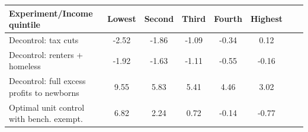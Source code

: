 \footnotesize
\renewcommand{\arraystretch}{1.2}
\begin{center}
\begin{tabular}{lccccccc}
\toprule
\textbf{Experiment/Income quintile} & \textbf{Lowest} & \textbf{Second} & \textbf{Third} & \textbf{Fourth} & \textbf{Highest}\\ 
\midrule
Decontrol: tax cuts & -2.52 & -1.86 & -1.09 & -0.34 & 0.12  \\
Decontrol: renters + homeless & -1.92 & -1.63 & -1.11 & -0.55 & -0.16 \\
Decontrol: full excess profits to newborns & 9.55 & 5.83 & 5.41 & 4.46 & 3.02 \\
Optimal unit control with bench. exempt. & 6.82 & 2.24 & 0.72 & -0.14 & -0.77 \\
\bottomrule
\end{tabular}
\end{center}
\normalsize
